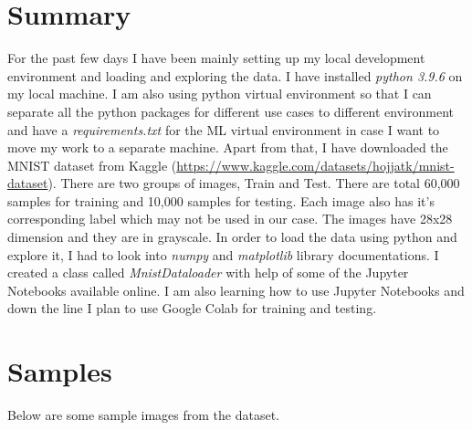 \documentclass{article}
\begin{document}
\thispagestyle{firstpage}

\section{Summary}
For the past few days I have been mainly setting up my local development environment and loading and exploring the data. I have installed \emph{python 3.9.6} on my local machine. I am also using python virtual environment so that I can separate all the python packages for different use cases to different environment and have a \emph{requirements.txt} for the ML virtual environment in case I want to move my work to a separate machine. Apart from that, I have downloaded the MNIST dataset from Kaggle (\url{https://www.kaggle.com/datasets/hojjatk/mnist-dataset}). There are two groups of images, Train and Test. There are total 60,000 samples for training and 10,000 samples for testing. Each image also has it's corresponding label which may not be used in our case. The images have 28x28 dimension and they are in grayscale. In order to load the data using python and explore it, I had to look into \emph{numpy} and \emph{matplotlib} library documentations. I created a class called \emph{MnistDataloader} with help of some of the Jupyter Notebooks available online. I am also learning how to use Jupyter Notebooks and down the line I plan to use Google Colab for training and testing.

\section{Samples}
Below are some sample images from the dataset.
\end{document}
